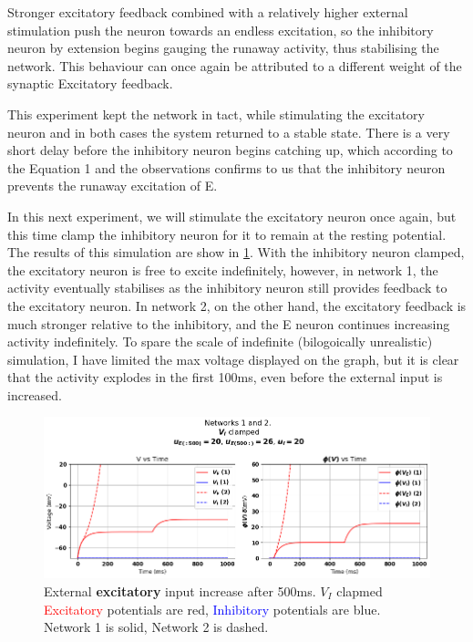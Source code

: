 \documentclass[10pt,twocolumn]{article}
\begin{document}
Stronger excitatory feedback combined with a relatively higher external
stimulation push the neuron towards an endless excitation, so the
inhibitory neuron by extension begins gauging the runaway activity,
thus stabilising the network. This behaviour can once again be
attributed to a different weight of the synaptic Excitatory feedback.

This experiment kept the network in tact, while stimulating the
excitatory neuron and in both cases the system returned to a
stable state. There is a very short delay before the inhibitory
neuron begins catching up, which according to the Equation 1 and
the observations confirms to us that the inhibitory neuron prevents
the runaway excitation of E.

In this next experiment, we will stimulate
the excitatory neuron once again, but this time clamp the inhibitory
neuron for it to remain at the resting potential. The results of this
simulation are show in \ref{fig:e-input-clamped}.
With the inhibitory neuron clamped, the excitatory neuron is free to
excite indefinitely, however, in network 1, the activity eventually stabilises
as the inhibitory neuron still provides feedback to the excitatory neuron.
In network 2, on the other hand, the excitatory feedback is much stronger
relative to the inhibitory, and the E neuron continues increasing activity
indefinitely. To spare the scale of indefinite (bilogoically unrealistic) 
simulation, I have limited the max voltage displayed on the graph, but it is
clear that the activity explodes in the first 100ms, even before the 
external input is increased.

\begin{figure}
    \centering
    \captionsetup{justification=centering}
    \includegraphics[width=1\textwidth]{images/12-E_input_V_I_clamped.png}
    \caption{External \textbf{excitatory} input increase after 500ms. $V_I$ clapmed \hspace{\textwidth}
        \textcolor{red}{Excitatory} potentials are red, \textcolor{blue}{Inhibitory} potentials are blue.\hspace{\textwidth}
        Network 1 is solid, Network 2 is dashed.}
    \label{fig:e-input-clamped}
\end{figure}
\end{document}
